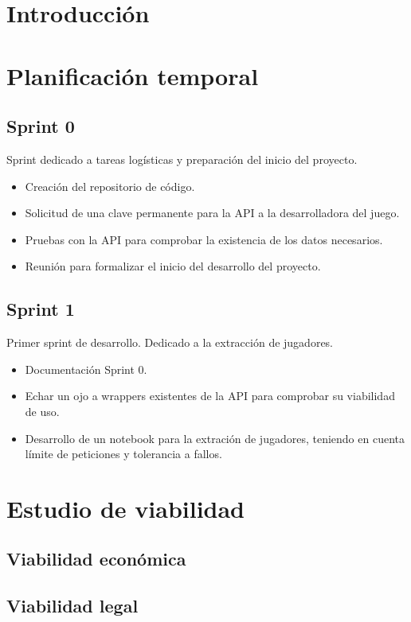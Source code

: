 
\section{Introducción}

\section{Planificación temporal}

\subsection{Sprint 0}

Sprint dedicado a tareas logísticas y preparación del inicio del proyecto.

\begin{itemize}
    \item Creación del repositorio de código.
    \item Solicitud de una clave permanente para la API a la desarrolladora del juego.
    \item Pruebas con la API para comprobar la existencia de los datos necesarios.
    \item Reunión para formalizar el inicio del desarrollo del proyecto.
\end{itemize}

\subsection{Sprint 1}

Primer sprint de desarrollo. Dedicado a la extracción de jugadores.

\begin{itemize}
    \item Documentación Sprint 0.
    \item Echar un ojo a wrappers existentes de la API para comprobar su viabilidad de uso.
    \item Desarrollo de un notebook para la extración de jugadores, teniendo en cuenta límite de peticiones y tolerancia a fallos.
\end{itemize}

\section{Estudio de viabilidad}

\subsection{Viabilidad económica}

\subsection{Viabilidad legal}


